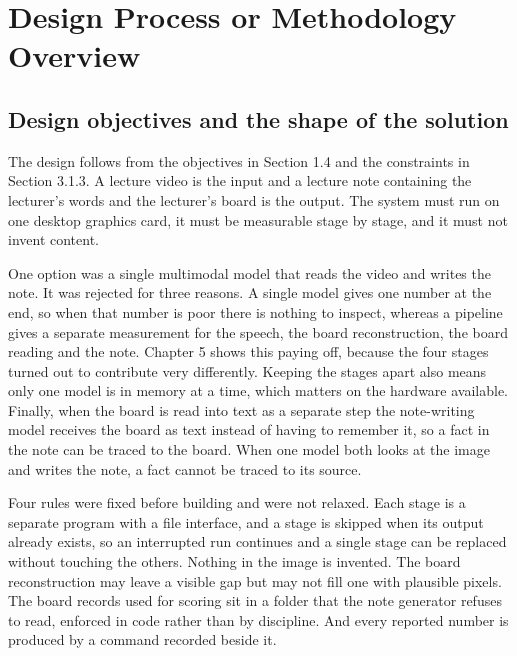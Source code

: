
\section{Design Process or Methodology Overview}

\subsection{Design objectives and the shape of the solution}

The design follows from the objectives in Section 1.4 and the constraints in Section
3.1.3. A lecture video is the input and a lecture note containing the lecturer's words
and the lecturer's board is the output. The system must run on one desktop graphics card,
it must be measurable stage by stage, and it must not invent content.

One option was a single multimodal model that reads the video and writes the note. It was
rejected for three reasons. A single model gives one number at the end, so when that
number is poor there is nothing to inspect, whereas a pipeline gives a separate
measurement for the speech, the board reconstruction, the board reading and the note.
Chapter 5 shows this paying off, because the four stages turned out to contribute very
differently. Keeping the stages apart also means only one model is in memory at a time,
which matters on the hardware available. Finally, when the board is read into text as a
separate step the note-writing model receives the board as text instead of having to
remember it, so a fact in the note can be traced to the board. When one model both looks
at the image and writes the note, a fact cannot be traced to its source.

Four rules were fixed before building and were not relaxed. Each stage is a separate
program with a file interface, and a stage is skipped when its output already exists, so
an interrupted run continues and a single stage can be replaced without touching the
others. Nothing in the image is invented. The board reconstruction may leave a visible
gap but may not fill one with plausible pixels. The board records used for scoring sit in
a folder that the note generator refuses to read, enforced in code rather than by
discipline. And every reported number is produced by a command recorded beside it.

